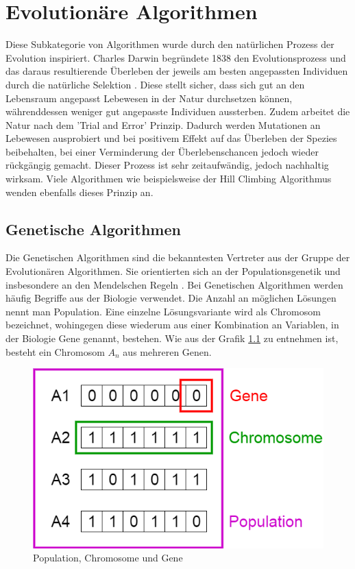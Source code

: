 \chapter{Evolutionäre Algorithmen}

Diese Subkategorie von Algorithmen wurde durch den natürlichen Prozess der Evolution
inspiriert. Charles Darwin begründete 1838 den Evolutionsprozess und das daraus resultierende
Überleben der jeweils am besten angepassten Individuen durch die natürliche Selektion \cite{Wiki02}.
Diese stellt sicher, dass sich gut an den Lebensraum angepasst Lebewesen in der Natur
durchsetzen können, währenddessen weniger gut angepasste Individuen aussterben. Zudem
arbeitet die Natur nach dem 'Trial and Error' Prinzip. Dadurch werden Mutationen an
Lebewesen ausprobiert und bei positivem Effekt auf das Überleben der Spezies beibehalten,
bei einer Verminderung der Überlebenschancen jedoch wieder rückgängig gemacht. Dieser Prozess
ist sehr zeitaufwändig, jedoch nachhaltig wirksam. Viele Algorithmen wie beispielsweise
der Hill Climbing Algorithmus \cite{Anr18} wenden ebenfalls dieses Prinzip an.

\section{Genetische Algorithmen}

Die Genetischen Algorithmen sind die bekanntesten Vertreter aus der Gruppe der Evolutionären
Algorithmen. Sie orientierten sich an der Populationsgenetik und insbesondere an den Mendelschen
Regeln \cite{Mcc00}.
Bei Genetischen Algorithmen werden häufig Begriffe aus der Biologie verwendet. Die Anzahl an
möglichen Lösungen nennt man Population. Eine einzelne Lösungsvariante wird als Chromosom
bezeichnet, wohingegen diese wiederum aus einer Kombination an Variablen, in der Biologie Gene
genannt, bestehen. Wie aus der Grafik \ref{fig:genetics} zu entnehmen ist, besteht ein Chromosom
$A_n$ aus mehreren Genen.
\\
\begin{figure}[h!]
  \centering
  \includegraphics[scale=0.5]{resources/genetic_algorithms.png}
  \caption{Population, Chromosome und Gene \cite{Mal17}}
  \label{fig:genetics}
\end{figure}

